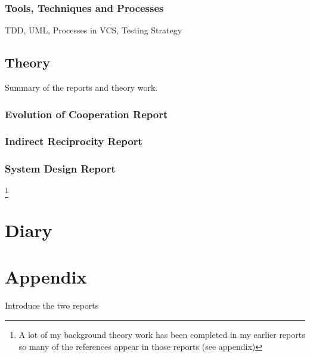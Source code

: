 \documentclass[]{final_report}
\begin{document}
\subsection{Tools, Techniques and Processes}

TDD, UML, Processes in VCS, Testing Strategy

\section{Theory}
Summary of the reports and theory work.
\subsection{Evolution of Cooperation Report}

\subsection{Indirect Reciprocity Report}

\subsection{System Design Report}

\newpage
{}

\footnote{A lot of my background theory work has been completed in my earlier reports so many of the references appear in those reports (see appendix)}
\label{endpage}

\chapter{Diary}

\chapter{Appendix}
Introduce the two reports

%

%
\end{document}

